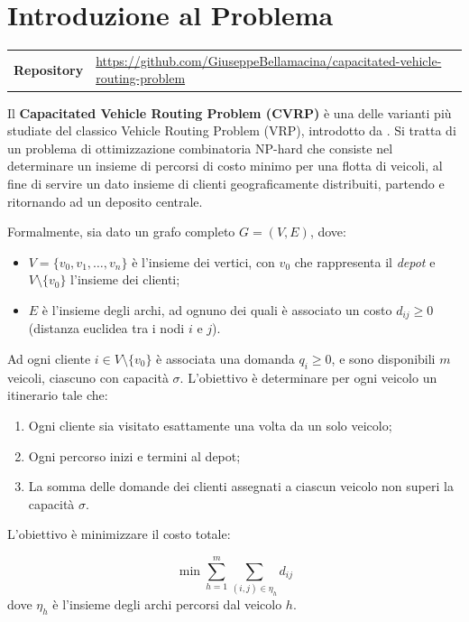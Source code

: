 \section{Introduzione al Problema}

\noindent
\begin{tabular}{@{}l@{\quad}l@{}}
  \textbf{Repository} & \url{https://github.com/GiuseppeBellamacina/capacitated-vehicle-routing-problem} \\
\end{tabular}
\bigskip

Il \textbf{Capacitated Vehicle Routing Problem (CVRP)} \`e una delle varianti pi\`u studiate
del classico Vehicle Routing Problem (VRP), introdotto da \cite{dantzig1959truck}.
Si tratta di un problema di ottimizzazione
combinatoria NP-hard \cite{toth2002vehicle} che consiste nel determinare un insieme di percorsi di costo minimo
per una flotta di veicoli, al fine di servire un dato insieme di clienti geograficamente
distribuiti, partendo e ritornando ad un deposito centrale.

Formalmente, sia dato un grafo completo $G = (V, E)$, dove:
\begin{itemize}
    \item $V = \{v_0, v_1, \dots, v_n\}$ \`e l'insieme dei vertici, con $v_0$ che
          rappresenta il \textit{depot} e $V \setminus \{v_0\}$ l'insieme dei clienti;
    \item $E$ \`e l'insieme degli archi, ad ognuno dei quali \`e associato un costo
          $d_{ij} \geq 0$ (distanza euclidea tra i nodi $i$ e $j$).
\end{itemize}

Ad ogni cliente $i \in V \setminus \{v_0\}$ \`e associata una domanda $q_i \geq 0$,
e sono disponibili $m$ veicoli, ciascuno con capacit\`a $\sigma$.
L'obiettivo \`e determinare per ogni veicolo un itinerario tale che:
\begin{enumerate}[label=(\roman*)]
    \item Ogni cliente sia visitato esattamente una volta da un solo veicolo;
    \item Ogni percorso inizi e termini al depot;
    \item La somma delle domande dei clienti assegnati a ciascun veicolo non superi
          la capacit\`a $\sigma$.
\end{enumerate}

L'obiettivo \`e minimizzare il costo totale:

\begin{equation}
    \min \sum_{h=1}^{m} \sum_{(i,j) \in \eta_h} d_{ij}
\end{equation}
dove $\eta_h$ \`e l'insieme degli archi percorsi dal veicolo $h$.

